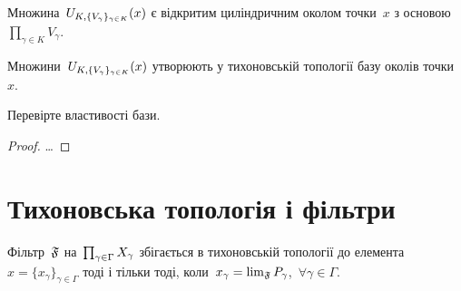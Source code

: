 \begin{remark}
    Множина~$U_{K,\{V_\gamma\}_{\gamma\in K}}(x)$ є відкритим циліндричним околом точки~$x$ з основою~$\prod_{\gamma \in K} V_\gamma$.
\end{remark}

\begin{theorem}
    \label{th:tychonoff-topology-base}
    Множини~$U_{K,\{V_\gamma\}_{\gamma\in K}}(x)$ утворюють у тихоновській топології базу околів точки~$x$.
\end{theorem}

\begin{exercise}
    Перевірте властивості бази.
\end{exercise}

\begin{proof}
    \dots
\end{proof}

\section{Тихоновська топологія і фільтри}

\begin{theorem}
    \label{th:tychonoff-topology-convergence-criterion}
    Фільтр~$\frak F$ на~$\prod_{\gamma\in\Gamma}{X}_\gamma$ збігається в тихоновській топології до елемента~$x = \{x_\gamma\}_{\gamma \in \Gamma}$ тоді і тільки тоді, коли~$x_\gamma = \lim_{\frak F} P_\gamma$,~$\forall \gamma \in \Gamma$.
\end{theorem}

